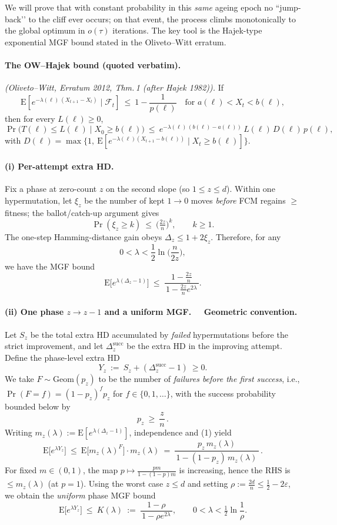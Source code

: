 \documentclass[lettersize,journal]{IEEEtran}
\newcommand{\EE}{\text{E}}
\begin{document}
We will prove that with constant probability in this \emph{same} ageing epoch no “jump-back’’ to the cliff ever occurs; on that event, the process climbs monotonically to the global optimum in \(o(\tau)\) iterations. The key tool is the Hajek-type exponential MGF bound stated in the Oliveto–Witt erratum.

\paragraph{The OW–Hajek bound (quoted verbatim).}
\emph{(Oliveto–Witt, Erratum 2012, Thm.\,1 (after Hajek 1982)).}
If
\[
\EE\!\left[e^{-\lambda(\ell)\,(X_{t+1}-X_t)}\mid \mathcal F_t\right]\ \le\ 1-\frac{1}{p(\ell)}
\quad\text{for }a(\ell)<X_t<b(\ell),
\]
then for every \(L(\ell)\ge 0\),
\[
\Pr\!\big(T(\ell)\le L(\ell)\mid X_0\ge b(\ell)\big)
\ \le\ e^{-\lambda(\ell)\,(b(\ell)-a(\ell))}\,L(\ell)\,D(\ell)\,p(\ell),
\]
with \(D(\ell)=\max\{1,\ \EE[e^{-\lambda(\ell)(X_{t+1}-b(\ell))}\mid X_t\ge b(\ell)]\}\).

\paragraph{(i) Per-attempt extra HD.}
Fix a phase at zero-count \(z\) on the second slope (so \(1\le z\le d\)).
Within one hypermutation, let \(\xi_z\) be the number of kept \(1\!\to 0\) moves \emph{before} FCM regains \(\ge\) fitness; the ballot/catch-up argument gives
\[
\Pr(\xi_z\ge k)\ \le\ \Big(\tfrac{2z}{n}\Big)^k,\qquad k\ge 1.
\]
The one-step Hamming-distance gain obeys \(\Delta_z\le 1+2\xi_z\). Therefore, for any
\[
0<\lambda<\frac12\ln\!\Big(\frac{n}{2z}\Big),
\]
we have the MGF bound
\[
\EE\!\big[e^{\lambda(\Delta_z-1)}\big]\ \le\ \frac{1-\tfrac{2z}{n}}{\,1-\tfrac{2z}{n}e^{2\lambda}\,}.
\tag{1}
\]

\paragraph{(ii) One phase \(z\to z-1\) and a uniform MGF. \ \ Geometric convention.}
Let \(S_z\) be the total extra HD accumulated by \emph{failed} hypermutations before the strict improvement, and let \(\Delta_z^{\mathrm{succ}}\) be the extra HD in the improving attempt. Define the phase-level extra HD
\[
Y_z\ :=\ S_z+(\Delta^{\mathrm{succ}}_z-1)\ \ge 0.
\]
We take \(F\sim\mathrm{Geom}(p_z)\) to be the number of \emph{failures before the first success}, i.e., \(\Pr(F=f)=(1-p_z)^f p_z\) for \(f\in\{0,1,\dots\}\), with the success probability bounded below by
\[
p_z\ \ge\ \frac{z}{n}\,.\tag{2}
\]
Writing \(m_z(\lambda):=\EE[e^{\lambda(\Delta_z-1)}]\), independence and (1) yield
\[
\EE\!\big[e^{\lambda Y_z}\big]
\ \le\ 
\EE\!\big[m_z(\lambda)^F\big]\cdot m_z(\lambda)
\ =\ \frac{p_z\,m_z(\lambda)}{\,1-(1-p_z)\,m_z(\lambda)\,}\,.
\]
For fixed \(m\in(0,1)\), the map \(p\mapsto \frac{pm}{1-(1-p)m}\) is increasing, hence the RHS is \(\le m_z(\lambda)\) (at \(p=1\)). Using the worst case \(z\le d\) and setting \(\rho:=\frac{2d}{n}\le \frac12-2\varepsilon\), we obtain the \emph{uniform} phase MGF bound
\[
\EE\!\big[e^{\lambda Y_z}\big]\ \le\ K(\lambda)\ :=\ \frac{1-\rho}{\,1-\rho e^{2\lambda}\,},
\qquad 0<\lambda<\tfrac12\ln\frac{1}{\rho}.
\tag{3}
\]
\end{document}
